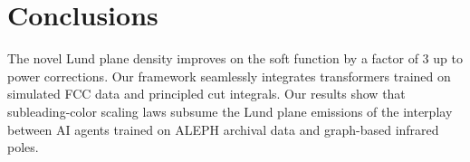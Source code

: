 \section{Conclusions}\label{sec:conclusions}

The novel Lund plane density improves on the soft function by a factor
of 3 up to power corrections. Our framework seamlessly integrates
transformers trained on simulated FCC data and principled cut integrals.
Our results show that subleading-color scaling laws subsume the Lund
plane emissions of the interplay between AI agents trained on ALEPH
archival data and graph-based infrared poles.

